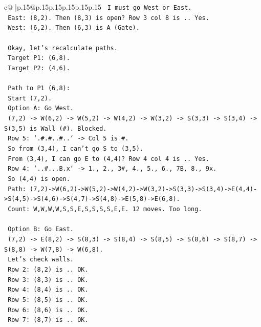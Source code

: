 \documentclass{article}
\begin{document}
{\begin{supertabular}{c@{$\;$}|p{.15\linewidth}@{}p{.15\linewidth}p{.15\linewidth}p{.15\linewidth}p{.15\linewidth}p{.15\linewidth}}
{{{\texttt{    I must go West or East.} \\
\texttt{    East: (8,2). Then (8,3) is open? Row 3 col 8 is .. Yes.} \\
\texttt{    West: (6,2). Then (6,3) is A (Gate).} \\
\\ 
\texttt{    Okay, let's recalculate paths.} \\
\texttt{    Target P1: (6,8).} \\
\texttt{    Target P2: (4,6).} \\
\\ 
\texttt{    Path to P1 (6,8):} \\
\texttt{    Start (7,2).} \\
\texttt{    Option A: Go West.} \\
\texttt{    (7,2) {-}> W(6,2) {-}> W(5,2) {-}> W(4,2) {-}> W(3,2) {-}> S(3,3) {-}> S(3,4) {-}> S(3,5) is Wall (\#). Blocked.} \\
\texttt{    Row 5: `.\#.\#..\#..` {-}> Col 5 is \#.} \\
\texttt{    So from (3,4), I can't go S to (3,5).} \\
\texttt{    From (3,4), I can go E to (4,4)? Row 4 col 4 is .. Yes.} \\
\texttt{    Row 4: `..\#...B.x` {-}> 1., 2., 3\#, 4., 5., 6., 7B, 8., 9x.} \\
\texttt{    So (4,4) is open.} \\
\texttt{    Path: (7,2){-}>W(6,2){-}>W(5,2){-}>W(4,2){-}>W(3,2){-}>S(3,3){-}>S(3,4){-}>E(4,4){-}>S(4,5){-}>S(4,6){-}>S(4,7){-}>S(4,8){-}>E(5,8){-}>E(6,8).} \\
\texttt{    Count: W,W,W,W,S,S,E,S,S,S,S,E,E. 12 moves. Too long.} \\
\\ 
\texttt{    Option B: Go East.} \\
\texttt{    (7,2) {-}> E(8,2) {-}> S(8,3) {-}> S(8,4) {-}> S(8,5) {-}> S(8,6) {-}> S(8,7) {-}> S(8,8) {-}> W(7,8) {-}> W(6,8).} \\
\texttt{    Let's check walls.} \\
\texttt{    Row 2: (8,2) is .. OK.} \\
\texttt{    Row 3: (8,3) is .. OK.} \\
\texttt{    Row 4: (8,4) is .. OK.} \\
\texttt{    Row 5: (8,5) is .. OK.} \\
\texttt{    Row 6: (8,6) is .. OK.} \\
\texttt{    Row 7: (8,7) is .. OK.} \\
}}}
\end{supertabular}}
\end{document}
